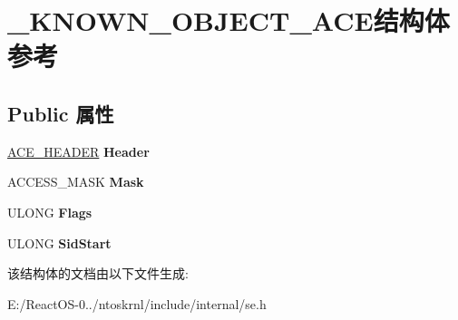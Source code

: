 \hypertarget{struct___k_n_o_w_n___o_b_j_e_c_t___a_c_e}{}\section{\+\_\+\+K\+N\+O\+W\+N\+\_\+\+O\+B\+J\+E\+C\+T\+\_\+\+A\+C\+E结构体 参考}
\label{struct___k_n_o_w_n___o_b_j_e_c_t___a_c_e}
\subsection*{Public 属性}
\begin{DoxyCompactItemize}
\item 
\mbox{\label{struct___k_n_o_w_n___o_b_j_e_c_t___a_c_e_a68949c9da690708b637aca9cc071f153}} 
\hyperlink{struct___a_c_e___h_e_a_d_e_r}{A\+C\+E\+\_\+\+H\+E\+A\+D\+ER} {\bfseries Header}
\item 
\mbox{\label{struct___k_n_o_w_n___o_b_j_e_c_t___a_c_e_aee35c29bd8a377f422889fd14d73df50}} 
A\+C\+C\+E\+S\+S\+\_\+\+M\+A\+SK {\bfseries Mask}
\item 
\mbox{\label{struct___k_n_o_w_n___o_b_j_e_c_t___a_c_e_af475cdeab2b9bb6b6cc164704d18b3f9}} 
U\+L\+O\+NG {\bfseries Flags}
\item 
\mbox{\label{struct___k_n_o_w_n___o_b_j_e_c_t___a_c_e_a5216d40d3573400dfd9c827ef00b69b3}} 
U\+L\+O\+NG {\bfseries Sid\+Start}
\end{DoxyCompactItemize}


该结构体的文档由以下文件生成\+:\begin{DoxyCompactItemize}
\item 
E\+:/\+React\+O\+S-\/0../ntoskrnl/include/internal/se.\+h\end{DoxyCompactItemize}
